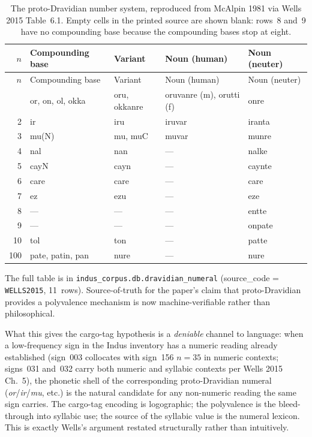 \begin{longtable}{@{}rllll@{}}
\caption{The proto-Dravidian number system, reproduced from McAlpin
1981 via Wells 2015 Table~6.1. Empty cells in the printed source are
shown blank: rows~8 and~9 have no compounding base because the
compounding bases stop at eight.}
\label{tab:dravidian}\\
\toprule
$n$ & Compounding base & Variant & Noun (human) & Noun (neuter) \\
\midrule
\endfirsthead
\toprule
$n$ & Compounding base & Variant & Noun (human) & Noun (neuter) \\
\midrule
\endhead
\bottomrule
\endlastfoot
1   & or, on, ol, okka & oru, okkanre & oruvanre (m), orutti (f) & onre  \\
\midrule
2   & ir               & iru          & iruvar                   & iranta\\
\midrule
3   & mu(N)            & mu, muC      & muvar                    & munre \\
\midrule
4   & nal              & nan          & ---                      & nalke \\
\midrule
5   & cayN             & cayn         & ---                      & caynte\\
\midrule
6   & care             & care         & ---                      & care  \\
\midrule
7   & ez               & ezu          & ---                      & eze   \\
\midrule
8   & ---              & ---          & ---                      & entte \\
\midrule
9   & ---              & ---          & ---                      & onpate\\
\midrule
10  & tol              & ton          & ---                      & patte \\
\midrule
100 & pate, patin, pan & nure         & ---                      & nure  \\
\end{longtable}

\noindent
The full table is in
\texttt{indus\_corpus.db.dravidian\_numeral} (source\_code =
\texttt{WELLS2015}, 11~rows). Source-of-truth for the paper's claim
that proto-Dravidian provides a polyvalence mechanism is now
machine-verifiable rather than philosophical.

What this gives the cargo-tag hypothesis is a \emph{deniable} channel
to language: when a low-frequency sign in the Indus inventory has a
numeric reading already established (sign~003 collocates with sign~156
$n=35$ in numeric contexts; signs~031 and~032 carry both numeric and
syllabic contexts per Wells 2015 Ch.~5\smartcite{Wells2015}), the
phonetic shell of the corresponding proto-Dravidian numeral
(\textit{or}/\textit{ir}/\textit{mu}, etc.) is the natural candidate
for any non-numeric reading the same sign carries. The cargo-tag
encoding is logographic; the polyvalence is the bleed-through into
syllabic use; the source of the syllabic value is the numeral lexicon.
This is exactly Wells's argument restated structurally rather than
intuitively.

